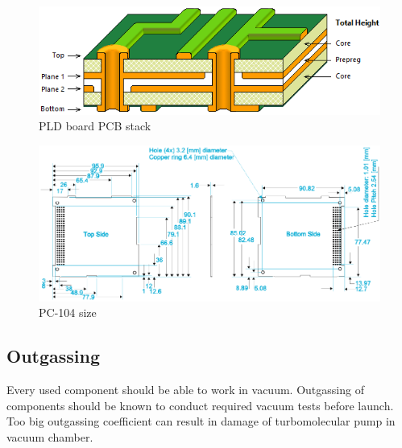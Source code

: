         \begin{figure}[H]
            \centering
            \includegraphics[width=0.5\paperwidth]{img/04/PLD_PCB_stack.png}
            \caption{PLD board PCB stack}
            \label{PLD_PCB_stack}
        \end{figure}

        \begin{figure}[H]
            \centering
            \includegraphics[width=0.7\paperwidth]{img/04/PC104_PLD_size.png}
            \caption{PC-104 size}
            \label{PLD_PCB_size}
        \end{figure}



    \subsection{Outgassing}
        Every used component should be able to work in vacuum. Outgassing of components should be known to conduct required vacuum tests before launch. Too big outgassing coefficient can result in damage of turbomolecular pump in vacuum chamber.

